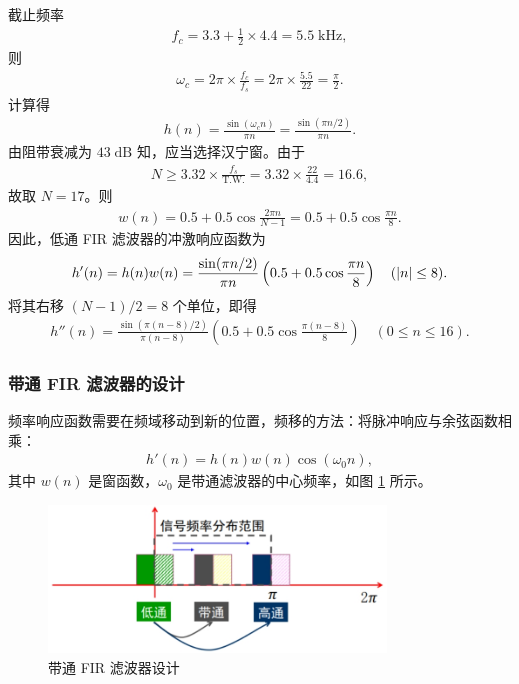 \begin{solution}
    截止频率
    \begin{align*}
        f_c = 3.3 + \frac{1}{2} \times 4.4 = 5.5\;\mathrm{kHz},
    \end{align*}
    则
    \begin{align*}
        \omega_c = 2\pi \times \frac{f_c}{f_s} = 2\pi \times \frac{5.5}{22} = \frac{\pi}{2}.
    \end{align*}
    计算得
    \begin{align*}
        h(n) = \frac{\sin(\omega_c n)}{\pi n} = \frac{\sin(\pi n / 2)}{\pi n}.
    \end{align*}
    由阻带衰减为 $43\;\mathrm{dB}$ 知，应当选择汉宁窗。由于
    \begin{align*}
        N \ge 3.32 \times \frac{f_s}{\text{T.W.}} = 3.32 \times \frac{22}{4.4} = 16.6,
    \end{align*}
    故取 $N = 17$。则
    \begin{align*}
        w(n) = 0.5 + 0.5\cos\frac{2\pi n}{N - 1} = 0.5 + 0.5\cos\frac{\pi n}{8}.
    \end{align*}
    因此，低通 FIR 滤波器的冲激响应函数为
    \begin{align*}
        h'(n) = h(n) w(n) = \frac{\sin(\pi n / 2)}{\pi n} \left(0.5 + 0.5\cos\frac{\pi n}{8}\right) \quad (\left|n\right| \le 8).
    \end{align*}
    将其右移 $(N - 1) / 2 = 8$ 个单位，即得
    \begin{align*}
        h''(n) = \frac{\sin(\pi (n - 8) / 2)}{\pi (n - 8)} \left(0.5 + 0.5\cos\frac{\pi (n - 8)}{8}\right) \quad (0 \le n \le 16).
    \end{align*}
\end{solution}

\subsubsection{带通 FIR 滤波器的设计}

频率响应函数需要在频域移动到新的位置，频移的方法：将脉冲响应与余弦函数相乘：
\begin{align*}
    h'(n) = h(n)w(n)\cos(\omega_0 n),
\end{align*}
其中 $w(n)$ 是窗函数，$\omega_0$ 是带通滤波器的中心频率，如图 \ref{fig:band-pass-filter-fir} 所示。

\begin{figure}[H]
    \centering
    \includegraphics[width=0.8\textwidth]{chap4/img/band_pass_filter_fir.png}
    \caption{带通 FIR 滤波器设计}
    \label{fig:band-pass-filter-fir}
\end{figure}

